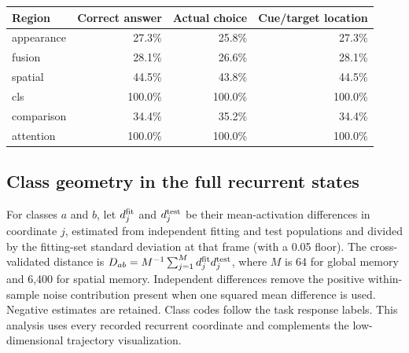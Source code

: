 \documentclass[11pt]{article}
\begin{document}
\begin{center}\small\begin{tabular}{lrrr}\toprule Region & Correct answer & Actual choice & Cue/target location\\\midrule
appearance & 27.3\% & 25.8\% & 27.3\%\\
fusion & 28.1\% & 26.6\% & 28.1\%\\
spatial & 44.5\% & 43.8\% & 44.5\%\\
cls & 100.0\% & 100.0\% & 100.0\%\\
comparison & 34.4\% & 35.2\% & 34.4\%\\
attention & 100.0\% & 100.0\% & 100.0\%\\
\bottomrule\end{tabular}\normalsize\end{center}
\subsection{Class geometry in the full recurrent states}
For classes $a$ and $b$, let $d^{\rm fit}_j$ and $d^{\rm test}_j$ be their mean-activation differences in coordinate $j$, estimated from independent fitting and test populations and divided by the fitting-set standard deviation at that frame (with a 0.05 floor). The cross-validated distance is $D_{ab}=M^{-1}\sum_{j=1}^{M}d^{\rm fit}_j d^{\rm test}_j$, where $M$ is 64 for global memory and 6,400 for spatial memory. Independent differences remove the positive within-sample noise contribution present when one squared mean difference is used. Negative estimates are retained. Class codes follow the task response labels. This analysis uses every recorded recurrent coordinate and complements the low-dimensional trajectory visualization.
\end{document}
